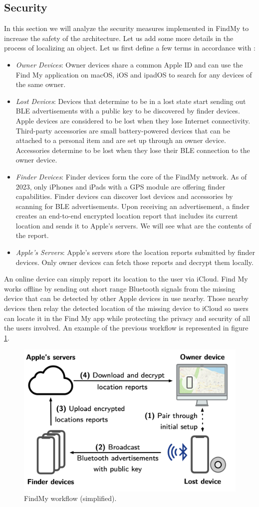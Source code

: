 \documentclass[english]{article}
\begin{document}
\subsection{Security}
In this section we will analyze the security measures implemented in FindMy to increase the safety of the architecture. Let us add some more details in the process of localizing an object.
Let us first define a few terms in accordance with \cite{whocanfind}:
\begin{itemize}
  \item \textit{Owner Devices}: Owner devices share a common Apple ID and can use the Find My application on macOS, iOS and ipadOS to search for any devices of the same owner.
  \item \textit{Lost Devices}: Devices that determine to be in a lost state start sending out BLE advertisements with a public key to be discovered by finder devices. Apple devices are considered to be lost when they lose Internet connectivity. Third-party accessories \cite{gadget} are small battery-powered devices that can be attached to a personal item and are set up through an owner device. Accessories determine to be lost when they lose their BLE connection to the owner device.
  \item \textit{Finder Devices}: Finder devices form the core of the FindMy network. As of 2023, only iPhones and iPads with a GPS module are offering finder capabilities. Finder devices can discover lost devices and accessories by scanning for BLE advertisements. Upon receiving an advertisement, a finder creates an end-to-end encrypted location report that includes its current location and
  sends it to Apple’s servers. We will see what are the contents of the report.
  \item \textit{Apple’s Servers}: Apple’s servers store the location reports submitted by finder devices. Only owner devices can fetch those reports and decrypt them locally.
\end{itemize}
An online device can simply report its location to the user via iCloud. Find My works offline by sending out short range Bluetooth signals from the missing device that can be detected by other Apple devices in use nearby. Those nearby devices then relay the detected location of the missing device to iCloud so users can locate it in the Find My app while protecting the privacy and security of all the users involved. An example of the previous workflow is represented in figure \ref{process}.

\begin{figure}[]
	\centering
	\includegraphics[width=.5\textwidth]{images/process.png}
	\caption{FindMy workflow (simplified).}
	\label{process}
\end{figure}
\end{document}

